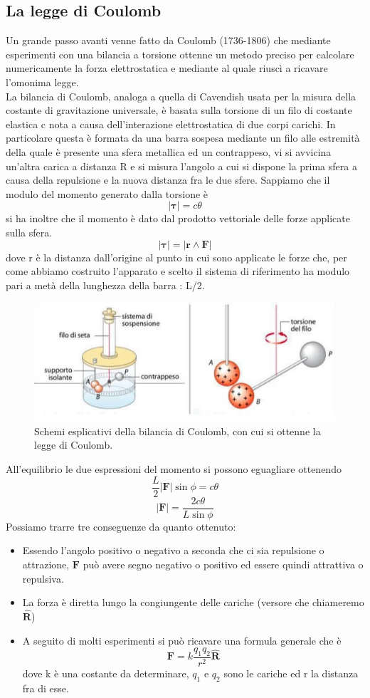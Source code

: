 \documentclass[10pt,a4paper]{article}
\begin{document}
\subsection{La legge di Coulomb}
Un grande passo avanti venne fatto da Coulomb (1736-1806) che mediante esperimenti con una bilancia a torsione ottenne un metodo preciso per calcolare numericamente la forza elettrostatica e mediante al quale riuscì a ricavare l'omonima legge.\\
La bilancia di Coulomb, analoga a quella di Cavendish usata per la misura della costante di gravitazione universale, è basata sulla torsione di un filo di costante elastica c nota a causa dell'interazione elettrostatica di due corpi carichi. In particolare questa è formata da una barra sospesa mediante un filo alle estremità della quale è presente una sfera metallica ed un contrappeso, vi si avvicina un'altra carica a distanza R e si misura l'angolo a cui si dispone la prima sfera a causa della repulsione e la nuova distanza fra le due sfere. Sappiamo che il modulo del momento generato dalla torsione è
\[|\mathbf{\tau}| = c\theta\]
si ha inoltre che il momento è dato dal prodotto vettoriale delle forze applicate sulla sfera.
\[|\mathbf{\tau}| = |\mathbf{r}\wedge \mathbf{F}|\]
dove r è la distanza dall'origine al punto in cui sono applicate le forze che, per come abbiamo costruito l'apparato e scelto il sistema di riferimento ha modulo pari a metà della lunghezza della barra : L/2. 
\begin{figure}[h!]
	\centering
	\includegraphics[width=0.6\linewidth]{images/bilancia_coulomb}
	\caption{Schemi esplicativi della bilancia di Coulomb, con cui si ottenne la legge di Coulomb.}
	\label{fig:bilanciacoulomb}
\end{figure}
\FloatBarrier
All'equilibrio le due espressioni del momento si possono eguagliare ottenendo 
\[\frac{L}{2}|\mathbf{F}|\sin\phi = c\theta\]
\[|\mathbf{F}| = \frac{2c\theta}{L\sin\phi}\] 
Possiamo trarre tre conseguenze da quanto ottenuto:
\begin{itemize}
	\item Essendo l'angolo positivo o negativo a seconda che ci sia repulsione o attrazione, $\mathbf{F}$ può avere segno negativo o positivo ed essere quindi attrattiva o repulsiva. 
	\item La forza è diretta lungo la congiungente delle cariche (versore che chiameremo $\hat{\mathbf{R}}$)
	\item A seguito di molti esperimenti si può ricavare una formula generale che è 
	\[\mathbf{F} = k \frac{q_1q_2}{r^2}\hat{\mathbf{R}}\]
	dove k è una costante da determinare, \(q_1\) e \(q_2\) sono le cariche ed r la distanza fra di esse. 
\end{itemize}
\end{document}
